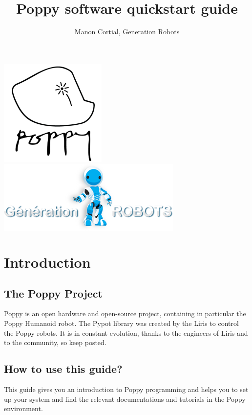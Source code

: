 \documentclass{article}
\begin{document}
\title{Poppy software quickstart guide}
\author{Manon Cortial, Generation Robots}

\maketitle

  \includegraphics[height=0.22\textwidth]{img/poppy-logo} \hfill \includegraphics[height=0.22\textwidth]{img/GR-logo}
  
  \tableofcontents

\section{Introduction}

\subsection{The Poppy Project}

Poppy is an open hardware and open-source project, containing in particular the Poppy Humanoid robot. The Pypot library  was created by the Liris to control the Poppy robots. It is in constant evolution, thanks to the engineers of Liris and to the community, so keep posted.



\subsection{How to use this guide?}

This guide gives you an introduction to Poppy programming and helps you to set up your system and find the relevant documentations and tutorials in the Poppy environment.
\end{document}
